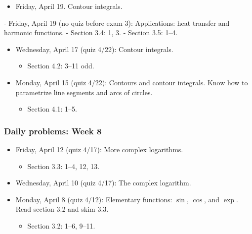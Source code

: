 \begin{itemize}
\item Friday, April 19. Contour integrals.

\end{itemize}

 - Friday, April 19 (no quiz before exam 3): Applications: heat transfer and harmonic functions. 
    - Section 3.4: 1, 3.
    - Section 3.5: 1--4. 

\begin{itemize}
\item Wednesday, April 17 (quiz 4\slash 22): Contour integrals.

\begin{itemize}
\item Section 4.2: 3--11 odd.

\end{itemize}

\item Monday, April 15 (quiz 4\slash 22): Contours and contour integrals. Know how to parametrize line segments and arcs of circles.

\begin{itemize}
\item Section 4.1: 1--5.

\end{itemize}

\end{itemize}

\subsubsection{Daily problems: Week 8}
\label{dailyproblems:week8}

\begin{itemize}
\item Friday, April 12 (quiz 4\slash 17): More complex logarithms.

\begin{itemize}
\item Section 3.3: 1--4, 12, 13.

\end{itemize}

\item Wednesday, April 10 (quiz 4\slash 17): The complex logarithm.

\item Monday, April 8 (quiz 4\slash 12): Elementary functions: $\sin$, $ \cos $, and $ \exp $. Read section 3.2 and skim 3.3.

\begin{itemize}
\item Section 3.2: 1--6, 9--11.

\end{itemize}

\end{itemize}

